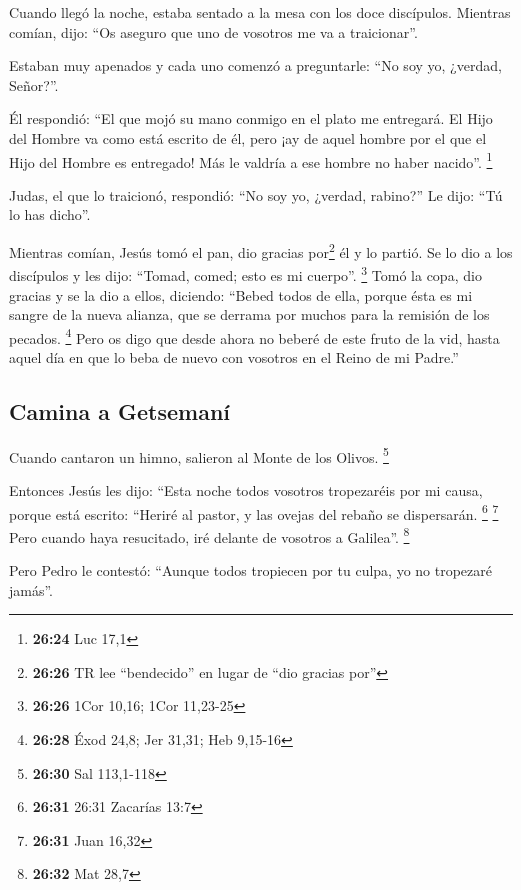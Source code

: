  Cuando llegó la noche, estaba sentado a la mesa con los
doce discípulos.  Mientras comían, dijo: ``Os aseguro que
uno de vosotros me va a traicionar''.

 Estaban muy apenados y cada uno comenzó a preguntarle:
``No soy yo, ¿verdad, Señor?''.

 Él respondió: ``El que mojó su mano conmigo en el plato
me entregará.  El Hijo del Hombre va como está escrito de
él, pero ¡ay de aquel hombre por el que el Hijo del Hombre es entregado!
Más le valdría a ese hombre no haber nacido''. \footnote{\textbf{26:24}
  Luc 17,1}

 Judas, el que lo traicionó, respondió: ``No soy yo,
¿verdad, rabino?'' Le dijo: ``Tú lo has dicho''.

 Mientras comían, Jesús tomó el pan, dio gracias
por\footnote{\textbf{26:26} TR lee ``bendecido'' en lugar de ``dio
  gracias por''} él y lo partió. Se lo dio a los discípulos y les dijo:
``Tomad, comed; esto es mi cuerpo''. \footnote{\textbf{26:26} 1Cor
  10,16; 1Cor 11,23-25}  Tomó la copa, dio gracias y se
la dio a ellos, diciendo: ``Bebed todos de ella,  porque
ésta es mi sangre de la nueva alianza, que se derrama por muchos para la
remisión de los pecados. \footnote{\textbf{26:28} Éxod 24,8; Jer 31,31;
  Heb 9,15-16}  Pero os digo que desde ahora no beberé de
este fruto de la vid, hasta aquel día en que lo beba de nuevo con
vosotros en el Reino de mi Padre.''

\hypertarget{camina-a-getsemanuxed}{%
\subsection{Camina a Getsemaní}\label{camina-a-getsemanuxed}}

 Cuando cantaron un himno, salieron al Monte de los
Olivos. \footnote{\textbf{26:30} Sal 113,1-118}

 Entonces Jesús les dijo: ``Esta noche todos vosotros
tropezaréis por mi causa, porque está escrito: ``Heriré al pastor, y las
ovejas del rebaño se dispersarán. \footnote{\textbf{26:31} 26:31
  Zacarías 13:7} \footnote{\textbf{26:31} Juan 16,32} 
Pero cuando haya resucitado, iré delante de vosotros a Galilea''.
\footnote{\textbf{26:32} Mat 28,7}

 Pero Pedro le contestó: ``Aunque todos tropiecen por tu
culpa, yo no tropezaré jamás''.

